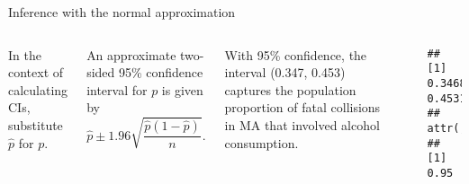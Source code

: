 \documentclass[
  ignorenonframetext,
  aspectratio=169]{beamer}
\newenvironment{Shaded}{\begin{snugshade}}{\end{snugshade}}
\newcommand{\AttributeTok}[1]{\textcolor[rgb]{0.13,0.29,0.53}{#1}}
\newcommand{\CommentTok}[1]{\textcolor[rgb]{0.56,0.35,0.01}{\textit{#1}}}
\newcommand{\DecValTok}[1]{\textcolor[rgb]{0.00,0.00,0.81}{#1}}
\newcommand{\FloatTok}[1]{\textcolor[rgb]{0.00,0.00,0.81}{#1}}
\newcommand{\FunctionTok}[1]{\textcolor[rgb]{0.13,0.29,0.53}{\textbf{#1}}}
\newcommand{\NormalTok}[1]{#1}
\newcommand{\SpecialCharTok}[1]{\textcolor[rgb]{0.81,0.36,0.00}{\textbf{#1}}}
\newcommand{\columnsbegin}{\begin{columns}}
\newcommand{\columnsend}{\end{columns}}
\begin{document}
\begin{frame}[fragile]{Inference with the normal approximation}
\protect\hypertarget{inference-with-the-normal-approximation}{}
\columnsbegin


\footnotesize

In the context of calculating CIs, substitute \(\hat{p}\) for \(p\).

\vspace{0.25cm}

An approximate two-sided 95\% confidence interval for \(p\) is given by
\[\hat{p} \pm 1.96 \sqrt{\frac{\hat{p}(1 - \hat{p})}{n}}. \]

\vspace{0.25cm}

With 95\% confidence, the interval (0.347, 0.453) captures the
population proportion of fatal collisions in MA that involved alcohol
consumption.


\scriptsize

\begin{Shaded}
\end{Shaded}

\begin{verbatim}
## [1] 0.3468427 0.4531286
## attr(,"conf.level")
## [1] 0.95
\end{verbatim}

\columnsend
\end{frame}
\end{document}
